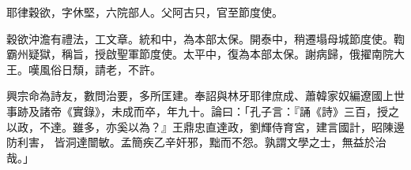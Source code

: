 \begin{pinyinscope}
 耶律穀欲，字休堅，六院部人。父阿古只，官至節度使。



 穀欲沖澹有禮法，工文章。統和中，為本部太保。開泰中，稍遷塌母城節度使。鞫霸州疑獄，稱旨，授啟聖軍節度使。太平中，復為本部太保。謝病歸，俄擢南院大王。嘆風俗日頹，請老，不許。



 興宗命為詩友，數問治要，多所匡建。奉詔與林牙耶律庶成、蕭韓家奴編遼國上世事跡及諸帝《實錄》，未成而卒，年九十。論曰：「孔子言：『誦《詩》三百，授之以政，不達。雖多，亦奚以為？』王鼎忠直達政，劉輝侍育宮，建言國計，昭陳邊防利害，
 皆洞達闓敏。孟簡疾乙辛奸邪，黜而不怨。孰謂文學之士，無益於治哉。」



\end{pinyinscope}